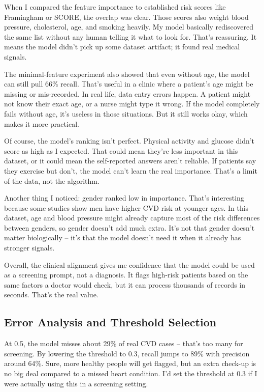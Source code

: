 \documentclass[12pt, a4paper, oneside]{book}
\begin{document}
When I compared the feature importance to established risk scores like Framingham or SCORE, the overlap was clear. Those scores also weight blood pressure, cholesterol, age, and smoking heavily. My model basically rediscovered the same list without any human telling it what to look for. That's reassuring. It means the model didn't pick up some dataset artifact; it found real medical signals.

The minimal-feature experiment also showed that even without age, the model can still pull 66\% recall. That's useful in a clinic where a patient's age might be missing or mis-recorded. In real life, data entry errors happen. A patient might not know their exact age, or a nurse might type it wrong. If the model completely fails without age, it's useless in those situations. But it still works okay, which makes it more practical.

Of course, the model's ranking isn't perfect. Physical activity and glucose didn't score as high as I expected. That could mean they're less important in this dataset, or it could mean the self-reported answers aren't reliable. If patients say they exercise but don't, the model can't learn the real importance. That's a limit of the data, not the algorithm.

Another thing I noticed: gender ranked low in importance. That's interesting because some studies show men have higher CVD risk at younger ages. In this dataset, age and blood pressure might already capture most of the risk differences between genders, so gender doesn't add much extra. It's not that gender doesn't matter biologically -- it's that the model doesn't need it when it already has stronger signals.

Overall, the clinical alignment gives me confidence that the model could be used as a screening prompt, not a diagnosis. It flags high-risk patients based on the same factors a doctor would check, but it can process thousands of records in seconds. That's the real value.

\subsection{Error Analysis and Threshold Selection}
At 0.5, the model misses about 29\% of real CVD cases – that's too many for screening. By lowering the threshold to 0.3, recall jumps to 89\% with precision around 64\%. Sure, more healthy people will get flagged, but an extra check-up is no big deal compared to a missed heart condition. I'd set the threshold at 0.3 if I were actually using this in a screening setting.
\end{document}
